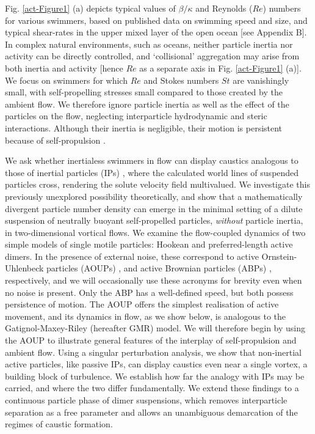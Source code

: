 \documentclass[../Rajarshi-thesis-draft.tex]{subfiles}
\begin{document}
Fig. \ref{act-Figure1} (a) depicts typical values of $\beta/\kappa$ and Reynolds ($Re$) numbers for various swimmers, based on published data on swimming speed and size, and typical shear-rates in the upper mixed layer of the open ocean \cite{StockerARFM2012} [see Appendix B]. In complex natural environments, such as oceans, neither particle inertia nor activity can be directly controlled, and `collisional' aggregation \cite{pumir2016} may arise from both inertia and activity [hence $Re$ as a separate axis in Fig. \ref{act-Figure1} (a)]. We focus on swimmers for which $Re$ and Stokes numbers $St$ are vanishingly small, with self-propelling stresses small compared to those created by the ambient flow. We therefore ignore particle inertia as well as the effect of the particles on the flow, neglecting interparticle hydrodynamic and steric interactions. Although their inertia is negligible, their motion is persistent because of self-propulsion \cite{Durham2013}.

We ask whether inertialess swimmers in flow \cite{pedley1992hydrodynamic} can display caustics analogous to those of inertial particles (IPs) \cite{Wilkinson_2005,Croor2015}, where the calculated world lines of suspended particles cross, rendering the solute velocity field multivalued. We investigate this previously unexplored possibility theoretically, and show that a mathematically divergent particle number density can emerge  in the minimal setting of a dilute suspension of neutrally buoyant self-propelled particles, \textit{without} particle inertia, in two-dimensional vortical flows. We examine the flow-coupled dynamics of two simple models of single motile particles: Hookean and preferred-length active dimers. In the presence of external noise, these correspond to active Ornstein-Uhlenbeck particles (AOUPs) \cite{Howfar2016, Bonilla2019}, and active Brownian particles (ABPs) \cite{Romanczuk2012}, respectively, and we will occasionally use these acronyms for brevity even when no noise is present. Only the ABP has a well-defined speed, but both possess persistence of motion. The AOUP offers the simplest realisation of active movement, and its dynamics in flow, as we show below, is analogous to the Gatignol-Maxey-Riley \cite{gatignol1983,MR1983} (hereafter GMR) model. We will therefore begin by using the AOUP to illustrate general features of the interplay of self-propulsion and ambient flow. Using a singular perturbation analysis, we show that non-inertial active particles, like passive IPs, can display caustics even near a single vortex, a building block of turbulence. We establish how far the analogy with IPs may be carried, and where the two differ fundamentally. We extend these findings to a continuous particle phase of dimer suspensions, which removes interparticle separation as a free parameter and allows an unambiguous demarcation of the regimes of caustic formation.
\end{document}

